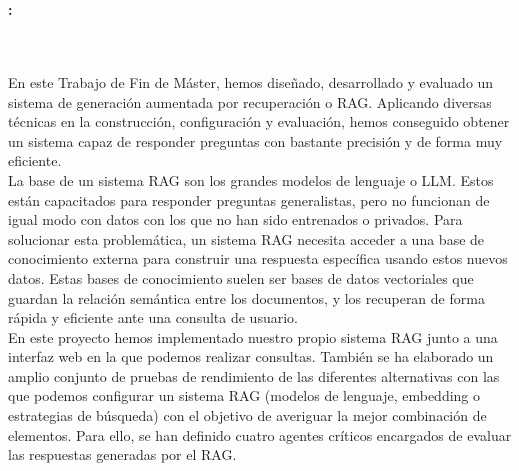 \chapter*{}
\thispagestyle{empty}
\cleardoublepage






\cleardoublepage
\thispagestyle{empty}

\begin{center}
{\large\bfseries \myTitle: \mySubTitle}\\
\end{center}

\\

\vspace{0.7cm}
\\

En este Trabajo de Fin de Máster, hemos diseñado, desarrollado y evaluado un sistema de generación aumentada por recuperación o RAG. Aplicando diversas técnicas en la construcción, configuración y evaluación, hemos conseguido obtener un sistema capaz de responder preguntas con bastante precisión y de forma muy eficiente.\\

\noindent La base de un sistema RAG son los grandes modelos de lenguaje o LLM. Estos están capacitados para responder preguntas generalistas, pero no funcionan de igual modo con datos con los que no han sido entrenados o privados. Para solucionar esta problemática, un sistema RAG necesita acceder a una base de conocimiento externa para construir una respuesta específica usando estos nuevos datos. Estas bases de conocimiento suelen ser bases de datos vectoriales que guardan la relación semántica entre los documentos, y los recuperan de forma rápida y eficiente ante una consulta de usuario.\\

\noindent En este proyecto hemos implementado nuestro propio sistema RAG junto a una interfaz web en la que podemos realizar consultas. También se ha elaborado un amplio conjunto de pruebas de rendimiento de las diferentes alternativas con las que podemos configurar un sistema RAG (modelos de lenguaje, embedding o estrategias de búsqueda) con el objetivo de averiguar la mejor combinación de elementos. Para ello, se han definido cuatro agentes críticos encargados de evaluar las respuestas generadas por el RAG.\\

